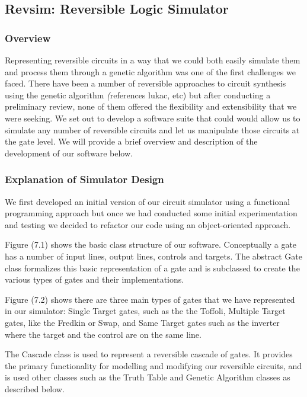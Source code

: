 \subsection{Revsim: Reversible Logic Simulator}
  \subsubsection{Overview}

Representing reversible circuits in a way that we could both easily simulate them and process them through 
a genetic algorithm was one of the first challenges we faced. There have been a number of reversible approaches 
to circuit synthesis using the genetic algorithm \emph(references lukac, etc) but after conducting a preliminary 
review, none of them offered the flexibility and extensibility that we were seeking. We set out to develop a 
software suite that could would allow us to simulate any number of reversible circuits and let us manipulate those 
circuits at the gate level. We will provide a brief overview and description of the development of our software below.

  \subsubsection{Explanation of Simulator Design}

We first developed an initial version of our circuit simulator using a functional programming approach but once we had conducted some initial 
experimentation and testing we decided to refactor our code using an object-oriented approach.

Figure (7.1) shows the basic class structure of our software. Conceptually a gate has a number of input lines, output lines, 
controls and targets. The abstract Gate class formalizes this basic representation of a gate and is subclassed to create 
the various types of gates and their implementations.

Figure (7.2) shows there are three main types of gates that we have represented in our simulator: Single Target 
gates, such as the the Toffoli, Multiple Target gates, like the Fredkin or Swap, and Same Target gates such as the inverter 
where the target and the control are on the same line.

The Cascade class is used to represent a reversible cascade of gates. It provides the primary functionality for modelling 
and modifying our reversible circuits, and is used other classes such as the Truth Table and Genetic Algorithm classes as 
described below.

